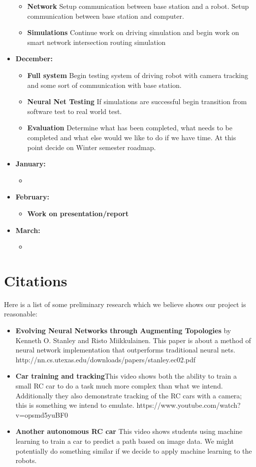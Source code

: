 \documentclass[a4paper]{article}
\begin{document}
\begin{itemize}
\begin{itemize}
				\item \textbf{Network} Setup communication between base station and a robot. Setup communication between base station and computer.
				\item \textbf{Simulations} Continue work on driving simulation and begin work on smart network intersection routing simulation
			\end{itemize}
		\item \textbf{December:}
			\begin{itemize}
				\item \textbf{Full system} Begin testing system of driving robot with camera tracking and some sort of communication with base station.
				\item \textbf{Neural Net Testing} If simulations are successful begin transition from software test to real world test.
				\item \textbf{Evaluation} Determine what has been completed, what needs to be completed and what else would we like to do if we have time. At this point decide on Winter semester roadmap.
			\end{itemize}
		\item \textbf{January:}
			\begin{itemize}
				\item 
			\end{itemize}
		\item \textbf{February:}
			\begin{itemize}
				\item \textbf{Work on presentation/report}
			\end{itemize}
		\item \textbf{March:}
			\begin{itemize}
				\item 
			\end{itemize}
	\end{itemize}
	\section*{Citations}
	Here is a list of some preliminary research which we believe shows our project is reasonable:
	\begin{itemize}
		\item \textbf{Evolving Neural Networks through Augmenting Topologies} by Kenneth O. Stanley and Risto Miikkulainen. This paper is about a method of neural network implementation that outperforms traditional neural nets. http://nn.cs.utexas.edu/downloads/papers/stanley.ec02.pdf
		\item \textbf{Car training and tracking}This video shows both the ability to train a small RC car to do a task much more complex than what we intend. Additionally they also demonstrate tracking of the RC cars with a camera; this is something we intend to emulate. https://www.youtube.com/watch?v=opsmd5yuBF0
		\item \textbf{Another autonomous RC car} This video shows students using machine learning to train a car to predict a path based on image data. We might potentially do something similar if we decide to apply machine learning to the robots.
	\end{itemize}
\end{document}
